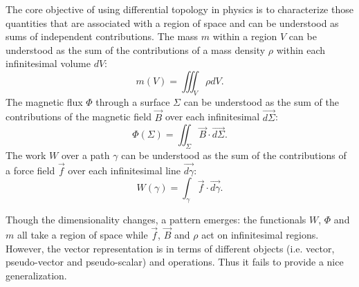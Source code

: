 \documentclass[fleqn,10pt]{wlscirep}
\begin{document}



The core objective of using differential topology in physics is to characterize those quantities that are associated with a region of space and can be understood as sums of independent contributions. The mass $m$ within a region $V$ can be understood as the sum of the contributions of a mass density $\rho$ within each infinitesimal volume $dV$:
\begin{equation*}
	m(V) = \iiint_V \rho dV.
\end{equation*}
The magnetic flux $\Phi$ through a surface $\Sigma$ can be understood as the sum of the contributions of the magnetic field $\vec{B}$ over each infinitesimal $\vec{d\Sigma}$:
\begin{equation*}
	\Phi(\Sigma) = \iint_\Sigma \vec{B} \cdot \vec{d\Sigma}.
\end{equation*}
The work $W$ over a path $\gamma$ can be understood as the sum of the contributions of a force field $\vec{f}$ over each infinitesimal line $\vec{d\gamma}$:
\begin{equation*}
	W(\gamma) = \int_\gamma \vec{f} \cdot \vec{d\gamma}.
\end{equation*}

Though the dimensionality changes, a pattern emerges: the functionals $W$, $\Phi$ and $m$ all take a region of space while $\vec{f}$, $\vec{B}$ and $\rho$ act on infinitesimal regions. However, the vector representation is in terms of different objects (i.e. vector, pseudo-vector and pseudo-scalar) and operations. Thus it fails to provide a nice generalization.
\end{document}
